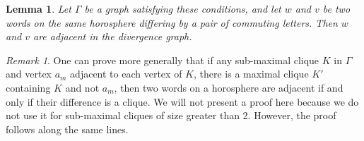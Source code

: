\documentclass{amsart}
\newtheorem{lemma}[theorem]{Lemma}
\theoremstyle{definition}
\theoremstyle{remark}
\newtheorem{remark}[theorem]{Remark}
\begin{document}
	\begin{lemma}
		
		Let $\Gamma$ be a graph satisfying these conditions, and let $w$ and $v$ be two words on the same horosphere differing by a pair of commuting letters. Then $w$ and $v$ are adjacent in the divergence graph.
		
	\end{lemma}
	
	\begin{remark}
		
		One can prove more generally that if any sub-maximal clique $K$ in $\Gamma$ and vertex $a_m$ adjacent to each vertex of $K$, there is a maximal clique $K'$ containing $K$ and not $a_m$, then two words on a horosphere are adjacent if and only if their difference is a clique. We will not present a proof here because we do not use it for sub-maximal cliques of size greater than 2. However, the proof follows along the same lines.
		
	\end{remark}
	
\end{document}
